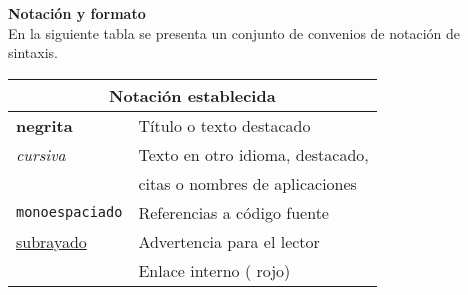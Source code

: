 \blankpage{}

\thispagestyle{prefacepage}
{\large \textbf{Notación y formato}} \smallskip 
\vspace{0.5cm}\\
En la siguiente tabla se presenta un conjunto de convenios de notación de sintaxis.\smallskip 
\vspace{0.5cm}
\begin{center}
    \begin{tabular}{|l|l|} \hline
        \multicolumn{2}{c}{Notación establecida} \\ \hline
        \textbf{negrita} & Título o texto destacado \\ \hline
        \textit{cursiva} & Texto en otro idioma, destacado, \\ & citas o nombres de aplicaciones \\ \hline
        \texttt{monoespaciado} & Referencias a código fuente \\ \hline
        \underline{subrayado} & Advertencia para el lector \\ \hline
        {\color{Red}{color}} &  Enlace interno ({\color{Red} rojo}) \\ \hline
    \end{tabular}
\end{center}


\blankpage{}



